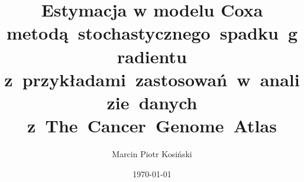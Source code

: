 \documentclass[]{mini}
\title{Estymacja w modelu Coxa metodą~stochastycznego~spadku~gradientu z~przykładami~zastosowań~w~analizie~danych z~The~Cancer~Genome~Atlas}
\author{Marcin Piotr Kosiński}
\date{\today}
\begin{document}
\maketitle
\tableofcontents













\appendix








\makestatement
\end{document}
